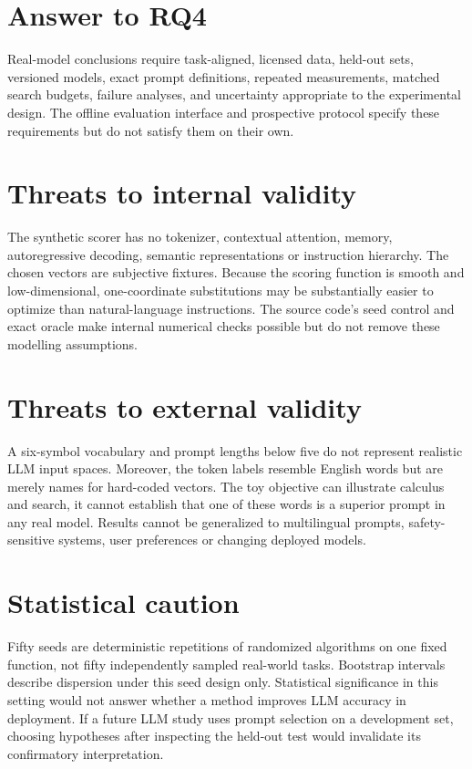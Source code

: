 \documentclass[12pt,a4paper,oneside]{report}
\begin{document}
\section{Answer to RQ4}
Real-model conclusions require task-aligned, licensed data, held-out sets, versioned models, exact prompt definitions, repeated measurements, matched search budgets, failure analyses, and uncertainty appropriate to the experimental design. The offline evaluation interface and prospective protocol specify these requirements but do not satisfy them on their own.

\section{Threats to internal validity}
The synthetic scorer has no tokenizer, contextual attention, memory, autoregressive decoding, semantic representations or instruction hierarchy. The chosen vectors are subjective fixtures. Because the scoring function is smooth and low-dimensional, one-coordinate substitutions may be substantially easier to optimize than natural-language instructions. The source code's seed control and exact oracle make internal numerical checks possible but do not remove these modelling assumptions.

\section{Threats to external validity}
A six-symbol vocabulary and prompt lengths below five do not represent realistic LLM input spaces. Moreover, the token labels resemble English words but are merely names for hard-coded vectors. The toy objective can illustrate calculus and search, it cannot establish that one of these words is a superior prompt in any real model. Results cannot be generalized to multilingual prompts, safety-sensitive systems, user preferences or changing deployed models.

\section{Statistical caution}
Fifty seeds are deterministic repetitions of randomized algorithms on one fixed function, not fifty independently sampled real-world tasks. Bootstrap intervals describe dispersion under this seed design only. Statistical significance in this setting would not answer whether a method improves LLM accuracy in deployment. If a future LLM study uses prompt selection on a development set, choosing hypotheses after inspecting the held-out test would invalidate its confirmatory interpretation.
\end{document}

